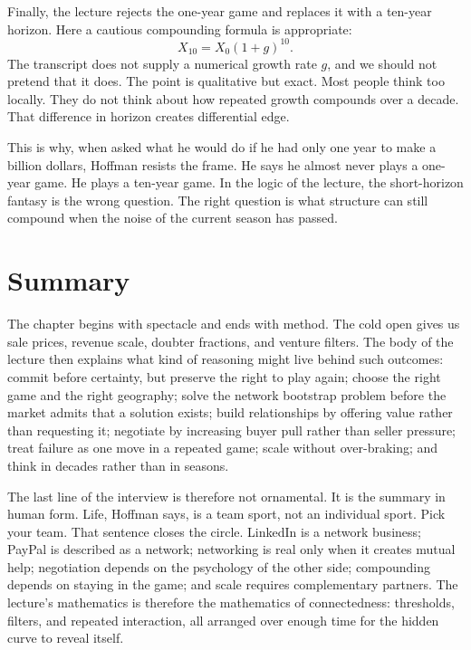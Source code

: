 Finally, the lecture rejects the one-year game and replaces it with a ten-year horizon. Here a cautious compounding formula is appropriate:
\begin{equation}
X_{10}=X_0(1+g)^{10}.
\end{equation}
The transcript does not supply a numerical growth rate \(g\), and we should not pretend that it does. The point is qualitative but exact. Most people think too locally. They do not think about how repeated growth compounds over a decade. That difference in horizon creates differential edge.

This is why, when asked what he would do if he had only one year to make a billion dollars, Hoffman resists the frame. He says he almost never plays a one-year game. He plays a ten-year game. In the logic of the lecture, the short-horizon fantasy is the wrong question. The right question is what structure can still compound when the noise of the current season has passed.

\section{Summary}

The chapter begins with spectacle and ends with method. The cold open gives us sale prices, revenue scale, doubter fractions, and venture filters. The body of the lecture then explains what kind of reasoning might live behind such outcomes: commit before certainty, but preserve the right to play again; choose the right game and the right geography; solve the network bootstrap problem before the market admits that a solution exists; build relationships by offering value rather than requesting it; negotiate by increasing buyer pull rather than seller pressure; treat failure as one move in a repeated game; scale without over-braking; and think in decades rather than in seasons.

The last line of the interview is therefore not ornamental. It is the summary in human form. Life, Hoffman says, is a team sport, not an individual sport. Pick your team. That sentence closes the circle. LinkedIn is a network business; PayPal is described as a network; networking is real only when it creates mutual help; negotiation depends on the psychology of the other side; compounding depends on staying in the game; and scale requires complementary partners. The lecture's mathematics is therefore the mathematics of connectedness: thresholds, filters, and repeated interaction, all arranged over enough time for the hidden curve to reveal itself.